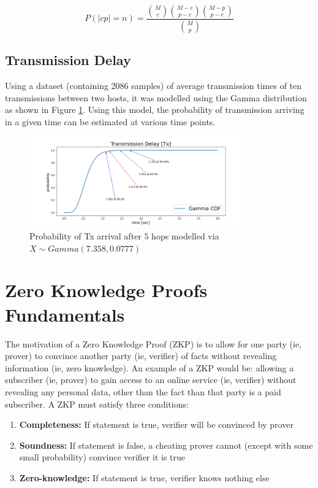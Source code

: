 \documentclass[peerreview]{ieeesyscoin}
\begin{document}
\begin{equation}
P(|cp| = n) = \frac{\binom{M}{c} \binom{M-c}{p-c} \binom{M-p}{p-c} }{\binom{M}{p}}
\end{equation}

\subsection{Transmission Delay}

Using a dataset (containing 2086 samples) of average transmission times of ten transmissions between two hosts, it was modelled using the Gamma distribution as shown in Figure \ref{fig:tx_delay}. Using this model, the probability of transmission arriving in a given time can be estimated at various time points.

\begin{figure}[h!]
\includegraphics[width=3.7in]{img/transmission_delay.png}
\caption{Probability of Tx arrival after $5$ hops modelled via $X \sim Gamma(7.358,0.0777)$} 
\label{fig:tx_delay}
\end{figure} 

\section{Zero Knowledge Proofs Fundamentals}

The motivation of a Zero Knowledge Proof (ZKP) is to allow for one party (ie, prover) to convince another party (ie, verifier) of facts without revealing information (ie, zero knowledge). An example of a ZKP would be: allowing a subscriber (ie, prover) to gain access to an online service (ie, verifier) without revealing any personal data, other than the fact than that party is a paid subscriber. A ZKP must satisfy three conditions:

\begin{enumerate}
\item \textbf{Completeness:} If statement is true, verifier will be convinced by prover
\item\textbf{Soundness:} If statement is false, a cheating prover cannot (except with some small probability) convince verifier it is true
\item \textbf{Zero-knowledge:} If statement is true, verifier knows nothing else
\end{enumerate}
\end{document}
